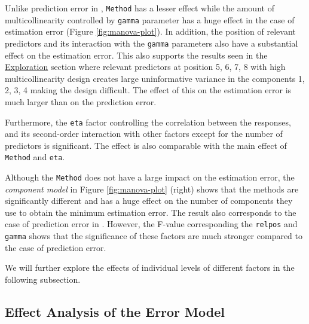 \documentclass[12pt,3p,authoryear]{elsarticle}
\providecommand{\tightlist}{%
  \setlength{\itemsep}{0pt}\setlength{\parskip}{0pt}}
\begin{document}
\begin{description}
\tightlist
\item[\textbf{Error Model:}]
Unlike prediction error in \citet{rimal2019pred}, \texttt{Method} has a
lesser effect while the amount of multicollinearity controlled by
\texttt{gamma} parameter has a huge effect in the case of estimation
error (Figure \ref{fig:manova-plot}). In addition, the position of
relevant predictors and its interaction with the \texttt{gamma}
parameters also have a substantial effect on the estimation error. This
also supports the results seen in the
\protect\hyperlink{exploration}{Exploration} section where relevant
predictors at position 5, 6, 7, 8 with high multicollinearity design
creates large uninformative variance in the components 1, 2, 3, 4 making
the design difficult. The effect of this on the estimation error is much
larger than on the prediction error.

Furthermore, the \texttt{eta} factor controlling the correlation between
the responses, and its second-order interaction with other factors
except for the number of predictors is significant. The effect is also
comparable with the main effect of \texttt{Method} and \texttt{eta}.
\item[\textbf{Component Model:}]
Although the \texttt{Method} does not have a large impact on the
estimation error, the \emph{component model} in Figure
\ref{fig:manova-plot} (right) shows that the methods are significantly
different and has a huge effect on the number of components they use to
obtain the minimum estimation error. The result also corresponds to the
case of prediction error in \citet{rimal2019pred}. However, the F-value
corresponding the \texttt{relpos} and \texttt{gamma} shows that the
significance of these factors are much stronger compared to the case of
prediction error.
\end{description}

We will further explore the effects of individual levels of different
factors in the following subsection.

\subsection{Effect Analysis of the Error
Model}\label{effect-analysis-of-the-error-model}
\end{document}

